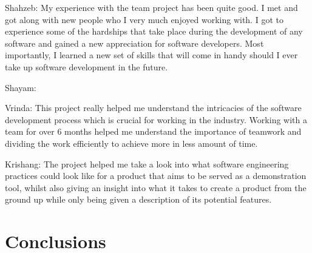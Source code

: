 \documentclass{l3proj}
\begin{document}
Shahzeb: My experience with the team project has been quite good. I met and got along with new people who I very much enjoyed working with. I got to experience some of the hardships that take place during the development of any software and gained a new appreciation for software developers. Most importantly, I learned a new set of skills that will come in handy should I ever take up software development in the future.

Shayam:

Vrinda: This project really helped me understand the intricacies of the software development process which is crucial for working in the industry. Working with a team for over 6 months helped me understand the importance of teamwork and dividing the work efficiently to achieve more in less amount of time.

Krishang: The project helped me take a look into what software engineering practices could look like for a product that aims to be served as a demonstration tool, whilst also giving an insight into what it takes to create a product from the ground up while only being given a description of its potential features.



\section{Conclusions}





\end{document}
